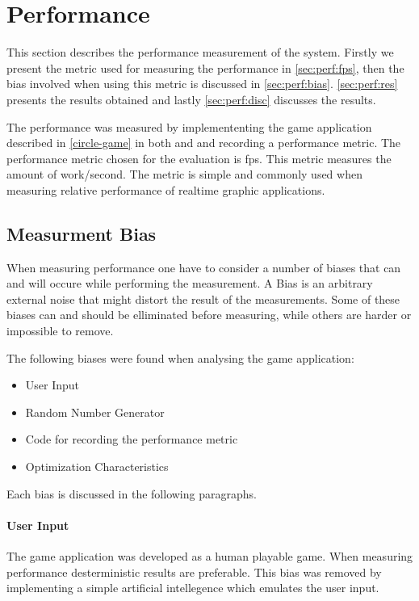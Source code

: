 \section{Performance}

This section describes the performance measurement of the system.
Firstly we present the metric used for measuring the performance in \autoref{sec:perf:fps}, then the bias involved when using this metric is discussed in \autoref{sec:perf:bias}.
\autoref{sec:perf:res} presents the results obtained and lastly \autoref{sec:perf:disc} discusses the results.

The performance was measured by implemententing the game application described in \autoref{circle-game} in both {\C} and {\rust} and recording a performance metric.
The performance metric chosen for the evaluation is \gls{fps}.
This metric measures the amount of work/second.
The metric is simple and commonly used when measuring relative performance of realtime graphic applications.

\subsection{Measurment Bias}
\label{sec:perf:bias}

When measuring performance one have to consider a number of biases that can and will occure while performing the measurement.
A Bias is an arbitrary external noise that might distort the result of the measurements.
Some of these biases can and should be elliminated before measuring, while others are harder or impossible to remove.

The following biases were found when analysing the game application:
\begin{itemize}
  \item User Input
  \item Random Number Generator
  \item Code for recording the performance metric
  \item Optimization Characteristics
\end{itemize}
Each bias is discussed in the following paragraphs.

\paragraph{User Input}
The game application was developed as a human playable game.
When measuring performance desterministic results are preferable.
This bias was removed by implementing a simple artificial intellegence which emulates the user input.

